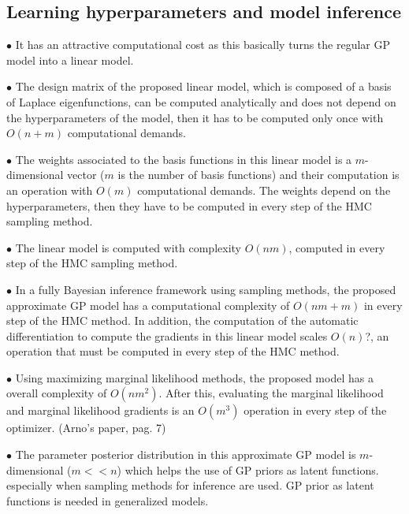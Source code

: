 \documentclass[]{interact}
\theoremstyle{plain}%
\theoremstyle{definition}
\theoremstyle{remark}
\begin{document}
\subsection{Learning hyperparameters and model inference}

\vspace{2mm}
$\bullet$ It has an attractive computational cost as this basically turns the regular GP model into a linear model.

\vspace{2mm}
$\bullet$ The design matrix of the proposed linear model, which is composed of a basis of Laplace eigenfunctions, can be computed analytically and does not depend on the hyperparameters of the model, then it has to be computed only once with $O(n+m)$ computational demands.

\vspace{2mm}
$\bullet$ The weights associated to the basis functions in this linear model is a $m$-dimensional vector ($m$ is the number of basis functions) and their computation is an operation with $O(m)$ computational demands. The weights depend on the hyperparameters, then they have to be computed in every step of the HMC sampling method.

\vspace{2mm}
$\bullet$ The linear model is computed with complexity $O(nm)$, computed in every step of the HMC sampling method.

\vspace{2mm}
$\bullet$ In a fully Bayesian inference framework using sampling methods, the proposed approximate GP model has a computational complexity of $O(nm+m)$ in every step of the HMC method. In addition, the computation of the automatic differentiation to compute the gradients in this linear model scales $O(n)$?, an operation that must be computed in every step of the HMC method.

\vspace{2mm}
$\bullet$ Using maximizing marginal likelihood methods, the proposed model has a overall complexity of $O(nm^2)$. After this, evaluating the marginal likelihood and marginal likelihood gradients is an $O(m^3)$ operation in every step of the optimizer. (Arno's paper, pag. 7)

\vspace{2mm}
$\bullet$ The parameter posterior distribution in this approximate GP model is $m$-dimensional ($m<<n$) which helps the use of GP priors as latent functions. especially when sampling methods for inference are used. GP prior as latent functions is needed in generalized models.
\end{document}
